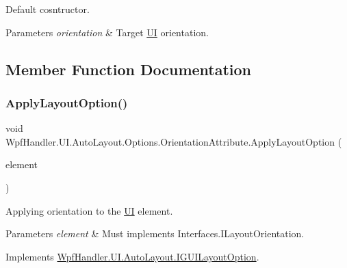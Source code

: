 Default cosntructor. 


\begin{DoxyParams}{Parameters}
{\em orientation} & Target \mbox{\hyperlink{namespace_wpf_handler_1_1_u_i}{UI}} orientation.\\
\hline
\end{DoxyParams}


\subsection{Member Function Documentation}
\mbox{\label{class_wpf_handler_1_1_u_i_1_1_auto_layout_1_1_options_1_1_orientation_attribute_affc825395d69d510dfc17e37d330dfc8}} 
\subsubsection{\texorpdfstring{Apply\+Layout\+Option()}{ApplyLayoutOption()}}
{\footnotesize\ttfamily void Wpf\+Handler.\+U\+I.\+Auto\+Layout.\+Options.\+Orientation\+Attribute.\+Apply\+Layout\+Option (\begin{DoxyParamCaption}\item[{Framework\+Element}]{element }\end{DoxyParamCaption})}



Applying orientation to the \mbox{\hyperlink{namespace_wpf_handler_1_1_u_i}{UI}} element. 


\begin{DoxyParams}{Parameters}
{\em element} & Must implements Interfaces.\+I\+Layout\+Orientation.\\
\hline
\end{DoxyParams}


Implements \mbox{\hyperlink{interface_wpf_handler_1_1_u_i_1_1_auto_layout_1_1_i_g_u_i_layout_option_ac2d2fa8aeaf753b3248381399f991005}{Wpf\+Handler.\+U\+I.\+Auto\+Layout.\+I\+G\+U\+I\+Layout\+Option}}.



